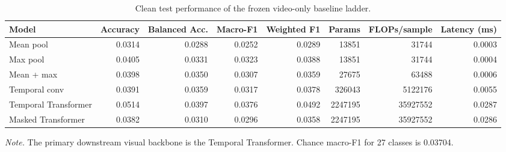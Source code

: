 \begin{table}[t]
\centering
\caption{Clean test performance of the frozen video-only baseline ladder.}
\label{tab:vision_baselines}
\begin{tabular}{lrrrrrrr}
\toprule
Model & Accuracy & Balanced Acc. & Macro-F1 & Weighted F1 & Params & FLOPs/sample & Latency (ms) \\
\midrule
Mean pool & 0.0314 & 0.0288 & 0.0252 & 0.0289 & 13851 & 31744 & 0.0003 \\
Max pool & 0.0405 & 0.0331 & 0.0323 & 0.0388 & 13851 & 31744 & 0.0004 \\
Mean + max & 0.0398 & 0.0350 & 0.0307 & 0.0359 & 27675 & 63488 & 0.0006 \\
Temporal conv & 0.0391 & 0.0359 & 0.0317 & 0.0378 & 326043 & 5122176 & 0.0055 \\
Temporal Transformer & 0.0514 & 0.0397 & 0.0376 & 0.0492 & 2247195 & 35927552 & 0.0287 \\
Masked Transformer & 0.0382 & 0.0310 & 0.0296 & 0.0358 & 2247195 & 35927552 & 0.0286 \\
\bottomrule
\end{tabular}
\par\smallskip\noindent\footnotesize\textit{Note.} The primary downstream visual backbone is the Temporal Transformer. Chance macro-F1 for 27 classes is 0.03704.
\end{table}
